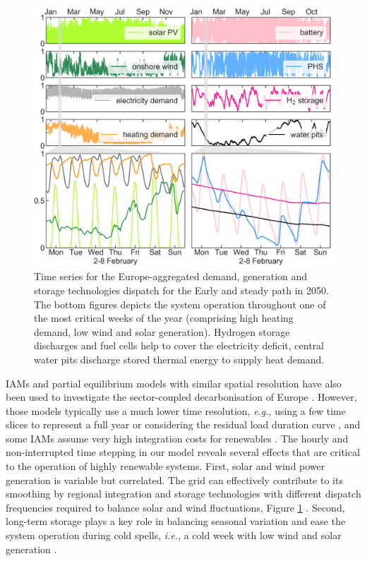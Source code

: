 \documentclass[5p]{elsarticle} %
\begin{document}
\begin{figure}[!h]
\centering
\includegraphics[width=\columnwidth]{../figures/time_series_zoom.png}
\caption{Time series for the Europe-aggregated demand, generation and storage technologies dispatch for the Early and steady path in 2050. The bottom figures depicts the system operation throughout one of the most critical weeks of the year (comprising high heating demand, low wind and solar generation). Hydrogen storage discharges and fuel cells help to cover the electricity deficit, central water pits discharge stored thermal energy to supply heat demand. } \label{fig_time_series} 
\end{figure}

IAMs and partial equilibrium models with similar spatial resolution have also been used to investigate the sector-coupled decarbonisation of Europe \cite{in-depth_2018, JRC-EU-TIMES, Creutzig_2017}. However, those models typically use a much lower time resolution, \textit{e.g.}, using a few time slices to represent a full year \cite{JRC-EU-TIMES, Loffler_2019, Poncelet_2016, McGlade_2015, Babrowski_2014} or considering the residual load duration curve \cite{Creutzig_2017, Ueckerdt_2017}, and some IAMs assume very high integration costs for renewables \cite{Pietzcker_2014}. The hourly and non-interrupted time stepping in our model reveals several effects that are critical to the operation of highly renewable systems. First, solar and wind power generation is variable but correlated. The grid can effectively contribute to its smoothing by regional integration and storage technologies with different dispatch frequencies required to balance solar and wind fluctuations, Figure \ref{fig_time_series} . Second, long-term storage plays a key role in balancing seasonal variation and ease the system operation during cold spells, \textsl{i.e.}, a cold week with low wind and solar generation \cite{Brown_2018}. 
\end{document}
